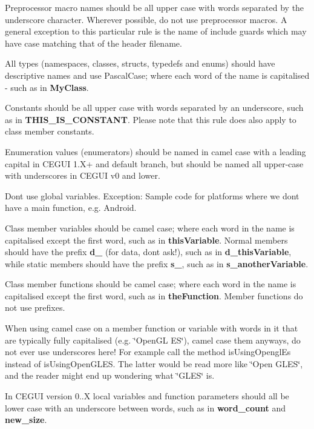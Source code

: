 \begin{DoxyItemize}
\item Preprocessor macro names should be all upper case with words separated by the underscore character. Wherever possible, do not use preprocessor macros. A general exception to this particular rule is the name of include guards which may have case matching that of the header filename.
\item All types (namespaces, classes, structs, typedefs and enums) should have descriptive names and use Pascal\+Case; where each word of the name is capitalised -\/ such as in {\bfseries{My\+Class}}.
\item Constants should be all upper case with words separated by an underscore, such as in {\bfseries{T\+H\+I\+S\+\_\+\+I\+S\+\_\+\+C\+O\+N\+S\+T\+A\+NT}}. Please note that this rule does also apply to class member constants.
\item Enumeration values (enumerators) should be named in camel case with a leading capital in C\+E\+G\+UI 1.\+X+ and default branch, but should be named all upper-\/case with underscores in C\+E\+G\+UI v0 and lower.
\item Don\textquotesingle{}t use global variables. Exception\+: Sample code for platforms where we don\textquotesingle{}t have a main function, e.\+g. Android.
\item Class member variables should be camel case; where each word in the name is capitalised except the first word, such as in {\bfseries{this\+Variable}}. Normal members should have the prefix {\bfseries{d\+\_\+}} (for data, don\textquotesingle{}t ask!), such as in {\bfseries{d\+\_\+this\+Variable}}, while static members should have the prefix {\bfseries{s\+\_\+}}, such as in {\bfseries{s\+\_\+another\+Variable}}.
\item Class member functions should be camel case; where each word in the name is capitalised except the first word, such as in {\bfseries{the\+Function}}. Member functions do not use prefixes.
\item When using camel case on a member function or variable with words in it that are typically fully capitalised (e.\+g. \char`\"{}\+Open\+G\+L E\+S\char`\"{}), camel case them anyways, do not ever use underscores here! For example call the method is\+Using\+Opengl\+Es instead of is\+Using\+Open\+G\+L\+ES. The latter would be read more like \char`\"{}\+Open G\+L\+E\+S\char`\"{}, and the reader might end up wondering what \char`\"{}\+G\+L\+E\+S\char`\"{} is.
\item In C\+E\+G\+UI version 0..\+X local variables and function parameters should all be lower case with an underscore between words, such as in {\bfseries{word\+\_\+count}} and {\bfseries{new\+\_\+size}}.

\end{DoxyItemize}
